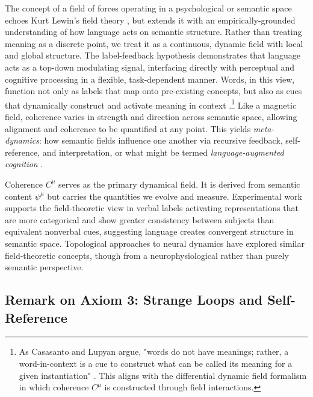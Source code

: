 The concept of a field of forces operating in a psychological or semantic space echoes Kurt Lewin's field theory \autocite{Lewin1951}, but extends it with an empirically-grounded understanding of how language acts on semantic structure. Rather than treating meaning as a discrete point, we treat it as a continuous, dynamic field with local and global structure. The label-feedback hypothesis \autocite{Lupyan2012LFH} demonstrates that language acts as a top-down modulating signal, interfacing directly with perceptual and cognitive processing in a flexible, task-dependent manner. Words, in this view, function not only as labels that map onto pre-existing concepts, but also as cues that dynamically construct and activate meaning in context \autocite{LupyanLewis2019, CasasantoLupyan2015}.\footnote{As Casasanto and Lupyan argue, "words do not have meanings; rather, a word-in-context is a cue to construct what can be called its meaning for a given instantiation" \autocite{CasasantoLupyan2015}. This aligns with the differential dynamic field formalism in which coherence \(C^\mu\) is constructed through field interactions.} Like a magnetic field, coherence varies in strength and direction across semantic space, allowing alignment and coherence to be quantified at any point. This yields \textit{meta-dynamics}: how semantic fields influence one another via recursive feedback, self-reference, and interpretation, or what might be termed \textit{language-augmented cognition} \autocite{Lupyan2012LAT}.

Coherence \(C^\mu\) serves as the primary dynamical field. It is derived from semantic content \(\psi^\mu\) but carries the quantities we evolve and measure. Experimental work supports the field-theoretic view in verbal labels activating representations that are more categorical and show greater consistency between subjects \autocite{LupyanThompsonSchill2012} than equivalent nonverbal cues, suggesting language creates convergent structure in semantic space. Topological approaches to neural dynamics \autocite{Bassett2018, Petri2014} have explored similar field-theoretic concepts, though from a neurophysiological rather than purely semantic perspective.


\subsection{Remark on Axiom 3: Strange Loops and Self-Reference}
\label{1.3.3:remark_1_3}

